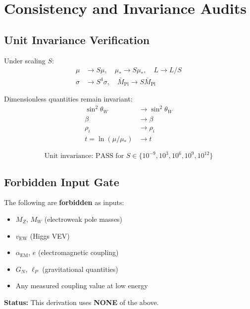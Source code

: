 \documentclass[11pt,a4paper]{article}
\theoremstyle{definition}
\begin{document}
\section{Consistency and Invariance Audits}
\label{sec:audits}

\subsection{Unit Invariance Verification}
\label{subsec:unit_inv}

Under scaling $S$:
\begin{align}
\label{eq:scale_mu}
\mu &\to S\mu, \quad \mu_* \to S\mu_*, \quad L \to L/S \\
\label{eq:scale_sigma}
\sigma &\to S^4\sigma, \quad \bar{M}_{\text{Pl}} \to S\bar{M}_{\text{Pl}}
\end{align}

Dimensionless quantities remain invariant:
\begin{align}
\label{eq:inv_sw2}
\sin^2\theta_W &\to \sin^2\theta_W \\
\label{eq:inv_beta}
\beta &\to \beta \\
\label{eq:inv_rho}
\rho_i &\to \rho_i \\
\label{eq:inv_t}
t = \ln(\mu/\mu_*) &\to t
\end{align}

\begin{equation}
\label{eq:unit_check}
\text{Unit invariance: PASS for } S \in \{10^{-9}, 10^3, 10^6, 10^9, 10^{12}\}
\end{equation}

\subsection{Forbidden Input Gate}
\label{subsec:forbidden}

\begin{lockbox}
The following are \textbf{forbidden} as inputs:
\begin{itemize}
\item $M_Z$, $M_W$ (electroweak pole masses)
\item $v_{\text{EW}}$ (Higgs VEV)
\item $\alpha_{\text{EM}}$, $e$ (electromagnetic coupling)
\item $G_N$, $\ell_P$ (gravitational quantities)
\item Any measured coupling value at low energy
\end{itemize}

\textbf{Status:} This derivation uses \textbf{NONE} of the above.
\end{lockbox}
\end{document}
